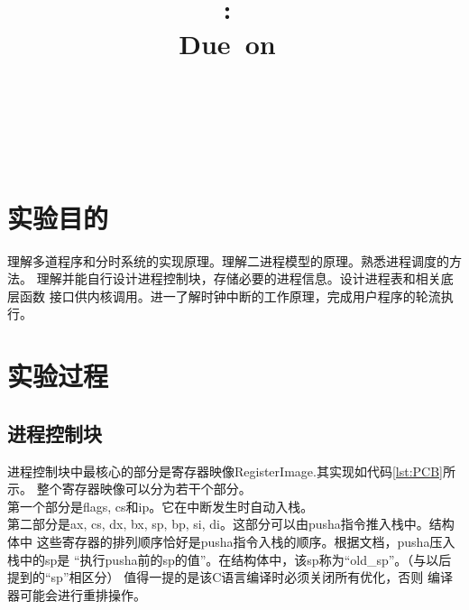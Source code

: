 \documentclass[a4paper]{article}
\title{
\vspace{2in}
\textmd{\textbf{\hmwkClass:\ \hmwkTitle}}\\
\normalsize\vspace{0.1in}\small{Due\ on\ \hmwkDueDate}\\
\vspace{0.1in}\large{\textit{\hmwkClassInstructor\ \hmwkClassTime}}
\vspace{3in}
}
\author{\textbf{\LARGE{\hmwkAuthorName}} \\ \\ \textbf{\LARGE{\hmwkAuthorId}}}
\date{} %
\begin{document}

\maketitle




\renewcommand{\contentsname}{Content} %
\newpage
\tableofcontents
{}
\newpage



\section{实验目的}
理解多道程序和分时系统的实现原理。理解二进程模型的原理。熟悉进程调度的方法。
理解并能自行设计进程控制块，存储必要的进程信息。设计进程表和相关底层函数
接口供内核调用。进一了解时钟中断的工作原理，完成用户程序的轮流执行。
\section{实验过程}
    \subsection{进程控制块}
    进程控制块中最核心的部分是寄存器映像RegisterImage.其实现如代码\ref{lst:PCB}所示。
    整个寄存器映像可以分为若干个部分。\\ 

    第一个部分是flags, cs和ip。它在中断发生时自动入栈。\\ 

    第二部分是ax, cs, dx, bx, sp, bp, si, di。这部分可以由pusha指令推入栈中。结构体中
    这些寄存器的排列顺序恰好是pusha指令入栈的顺序。根据文档，pusha压入栈中的sp是
    ``执行pusha前的sp的值''。在结构体中，该sp称为``old\_sp''。（与以后提到的``sp''相区分）
    值得一提的是该C语言编译时必须关闭所有优化，否则
    编译器可能会进行重排操作。\\ 
\end{document}
